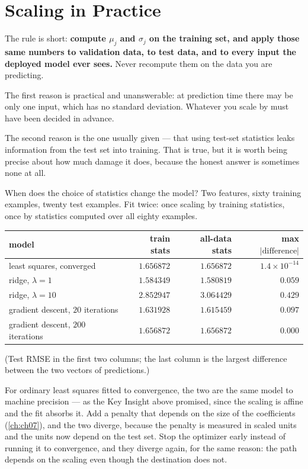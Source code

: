 \section{Scaling in Practice}
\label{sec:scaling-practice}

The rule is short: \textbf{compute $\mu_j$ and $\sigma_j$ on the training set,
and apply those same numbers to validation data, to test data, and to every
input the deployed model ever sees.} Never recompute them on the data you are
predicting.

The first reason is practical and unanswerable: at prediction time there may be
only one input, which has no standard deviation. Whatever you scale by must have
been decided in advance.

The second reason is the one usually given --- that using test-set statistics
leaks information from the test set into training. That is true, but it is worth
being precise about how much damage it does, because the honest answer is
sometimes none at all.

\begin{workedexample}{When does the choice of statistics change the model?}
Two features, sixty training examples, twenty test examples. Fit twice: once
scaling by training statistics, once by statistics computed over all eighty
examples.

\begin{center}
\small
\renewcommand{\arraystretch}{1.2}
\begin{tabular}{@{}lrrr@{}}
\toprule
model & train stats & all-data stats & max $|\text{difference}|$\\
\midrule
least squares, converged & $1.656872$ & $1.656872$ & $1.4\times10^{-14}$\\
ridge, $\lambda = 1$     & $1.584349$ & $1.580819$ & $0.059$\\
ridge, $\lambda = 10$    & $2.852947$ & $3.064429$ & $0.429$\\
gradient descent, $20$ iterations & $1.631928$ & $1.615459$ & $0.097$\\
gradient descent, $200$ iterations & $1.656872$ & $1.656872$ & $0.000$\\
\bottomrule
\end{tabular}
\end{center}
(Test RMSE in the first two columns; the last column is the largest difference
between the two vectors of predictions.)

For ordinary least squares fitted to convergence, the two are the same model to
machine precision --- as the Key Insight above promised, since the scaling is
affine and the fit absorbs it. Add a penalty that depends on the size of the
coefficients (\cref{ch:ch07}), and the two diverge, because the penalty is
measured in scaled units and the units now depend on the test set. Stop the
optimizer early instead of running it to convergence, and they diverge again,
for the same reason: the path depends on the scaling even though the destination
does not.
\end{workedexample}

